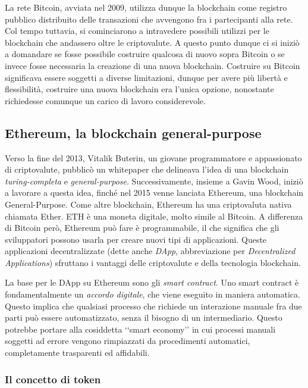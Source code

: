 La rete Bitcoin, avviata nel 2009, utilizza dunque la blockchain come registro pubblico distribuito delle transazioni che avvengono fra i partecipanti alla rete. Col tempo tuttavia, si cominciarono a intravedere possibili utilizzi per le blockchain che andassero oltre le criptovalute. A questo punto dunque ci si iniziò a domandare se fosse possibile costruire qualcosa di nuovo sopra Bitcoin o se invece fosse necessaria la creazione di una nuova blockchain. Costruire su Bitcoin significava essere soggetti a diverse limitazioni, dunque per avere più libertà e flessibilità, costruire una nuova blockchain era l'unica opzione, nonostante richiedesse comunque un carico di lavoro considerevole.

\subsection{Ethereum, la blockchain general-purpose}

Verso la fine del 2013, Vitalik Buterin, un giovane programmatore e appassionato di criptovalute, pubblicò un whitepaper che delineava l'idea di una blockchain \textit{turing-completa} e \textit{general-purpose}. Successivamente, insieme a Gavin Wood, iniziò a lavorare a questa idea, finché nel 2015 venne lanciata Ethereum, una blockchain General-Purpose. Come altre blockchain, Ethereum ha una criptovaluta nativa chiamata Ether. ETH è una moneta digitale, molto simile al Bitcoin. A differenza di Bitcoin però, Ethereum può fare è programmabile, il che significa che gli sviluppatori possono usarla per creare nuovi tipi di applicazioni. Queste applicazioni decentralizzate (dette anche \textit{DApp}, abbreviazione per \textit{Decentralized Applications}) sfruttano i vantaggi delle criptovalute e della tecnologia blockchain. 

La base per le DApp su Ethereum sono gli \textit{smart contract}. Uno smart contract è fondamentalmente un \textit{accordo digitale}, che viene eseguito in maniera automatica. Questo implica che qualsiasi processo che richiede un interazione manuale fra due parti può essere automatizzato, senza il bisogno di un intermediario. Questo potrebbe portare alla cosiddetta ‘‘smart economy’’ in cui processi manuali soggetti ad errore vengono rimpiazzati da procedimenti automatici, completamente trasparenti ed affidabili. 

\subsubsection{Il concetto di token}


